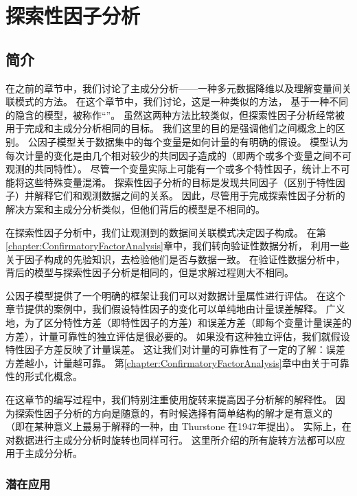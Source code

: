 \chapter{探索性因子分析}

\section{简介}

在之前的章节中，我们讨论了主成分分析——一种多元数据降维以及理解变量间关联模式的方法。
在这个章节中，我们讨论，这是一种类似的方法，
基于一种不同的隐含的模型，被称作“”。
虽然这两种方法比较类似，但探索性因子分析经常被用于完成和主成分分析相同的目标。
我们这里的目的是强调他们之间概念上的区别。
公因子模型关于数据集中的每个变量是如何计量的有明确的假设。
模型认为每次计量的变化是由几个相对较少的共同因子造成的（即两个或多个变量之间不可观测的共同特性）。
尽管一个变量实际上可能有一个或多个特性因子，统计上不可能将这些特殊变量混淆。
探索性因子分析的目标是发现共同因子（区别于特性因子）并解释它们和观测数据之间的关系。
因此，尽管用于完成探索性因子分析的解决方案和主成分分析类似，但他们背后的模型是不相同的。

在探索性因子分析中，我们让观测到的数据间关联模式决定因子构成。
在第\ref{chapter:ConfirmatoryFactorAnalysis}章中，我们转向验证性数据分析，
利用一些关于因子构成的先验知识，去检验他们是否与数据一致。
在验证性数据分析中，背后的模型与探索性因子分析是相同的，但是求解过程则大不相同。

公因子模型提供了一个明确的框架让我们可以对数据计量属性进行评估。
在这个章节提供的案例中，我们假设特性因子的变化可以单纯地由计量误差解释。
广义地，为了区分特性方差（即特性因子的方差）和误差方差（即每个变量计量误差的方差），计量可靠性的独立评估是很必要的。
如果没有这种独立评估，我们就假设特性因子方差反映了计量误差。
这让我们对计量的可靠性有了一定的了解：误差方差越小，计量越可靠。
第\ref{chapter:ConfirmatoryFactorAnalysis}章中由关于可靠性的形式化概念。

在这章节的编写过程中，我们特别注重使用旋转来提高因子分析解的解释性。
因为探索性因子分析的方向是随意的，有时候选择有简单结构的解才是有意义的
（即在某种意义上最易于解释的一种，由 Thurstone 在1947年提出）。
实际上，在对数据进行主成分分析时旋转也同样可行。
这里所介绍的所有旋转方法都可以应用于主成分分析。

\subsection{潜在应用}

